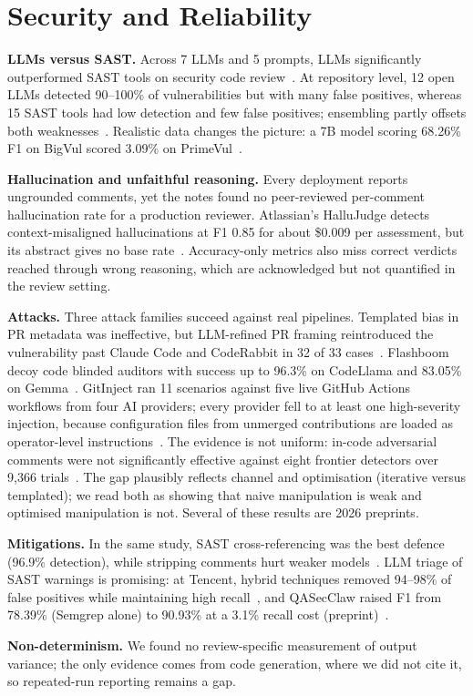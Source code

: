 \section{Security and Reliability}\label{sec:security}

\textbf{LLMs versus SAST.}
Across 7 LLMs and 5 prompts, LLMs significantly outperformed SAST tools on security code review~\cite{yu2024insight}. At repository level, 12 open LLMs detected 90--100\% of vulnerabilities but with many false positives, whereas 15 SAST tools had low detection and few false positives; ensembling partly offsets both weaknesses~\cite{zhou2024comparison}.
Realistic data changes the picture: a 7B model scoring 68.26\% F1 on BigVul scored 3.09\% on PrimeVul~\cite{ding2025vulnerability}.

\textbf{Hallucination and unfaithful reasoning.}
Every deployment reports ungrounded comments, yet the notes found no peer-reviewed per-comment hallucination rate for a production reviewer. Atlassian's HalluJudge detects context-misaligned hallucinations at F1 0.85 for about \$0.009 per assessment, but its abstract gives no base rate~\cite{tantithamthavorn2026hallujudge}. Accuracy-only metrics also miss correct verdicts reached through wrong reasoning, which are acknowledged but not quantified in the review setting.

\textbf{Attacks.}
Three attack families succeed against real pipelines. Templated bias in PR metadata was ineffective, but LLM-refined PR framing reintroduced the vulnerability past Claude Code and CodeRabbit in 32 of 33 cases~\cite{alexopoulos2026when}. Flashboom decoy code blinded auditors with success up to 96.3\% on CodeLlama and 83.05\% on Gemma~\cite{li2025make}. GitInject ran 11 scenarios against five live GitHub Actions workflows from four AI providers; every provider fell to at least one high-severity injection, because configuration files from unmerged contributions are loaded as operator-level instructions~\cite{isbarov2026gitinject}.
The evidence is not uniform: in-code adversarial comments were not significantly effective against eight frontier detectors over 9,366 trials~\cite{thornton2026can}. The gap plausibly reflects channel and optimisation (iterative versus templated); we read both as showing that naive manipulation is weak and optimised manipulation is not. Several of these results are 2026 preprints.

\textbf{Mitigations.}
In the same study, SAST cross-referencing was the best defence (96.9\% detection), while stripping comments hurt weaker models~\cite{thornton2026can}. LLM triage of SAST warnings is promising: at Tencent, hybrid techniques removed 94--98\% of false positives while maintaining high recall~\cite{du2026reducing}, and QASecClaw raised F1 from 78.39\% (Semgrep alone) to 90.93\% at a 3.1\% recall cost (preprint)~\cite{ameen2026qasecclaw}.

\textbf{Non-determinism.}
We found no review-specific measurement of output variance; the only evidence comes from code generation, where we did not cite it, so repeated-run reporting remains a gap.
